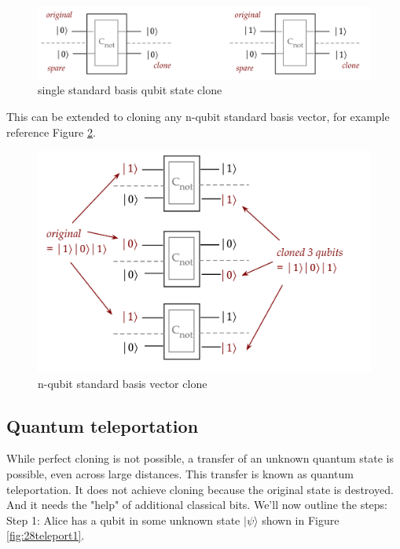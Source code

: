 \documentclass[main.tex]{subfiles}
\begin{document}
    \begin{figure}
        \centering
        \includegraphics[width=5in]{notes/figs/n07/26clone2.png}
        \caption{single standard basis qubit state clone}
        \label{fig:26clone2}
    \end{figure}
    
    This can be extended to cloning any n-qubit standard basis vector, for example reference Figure \ref{fig:27clone3}.
    
    \begin{figure}
        \centering
        \includegraphics[width=5in]{notes/figs/n07/27clone3.png}
        \caption{n-qubit standard basis vector clone}
        \label{fig:27clone3}
    \end{figure}

\subsection{Quantum teleportation}

    While perfect cloning is not possible, a transfer of an unknown quantum state is possible, even across large distances. This transfer is known as quantum teleportation. It does not achieve cloning because the original state is destroyed. And it needs the "help" of additional classical bits. We'll now outline the steps: Step 1: Alice has a qubit in some unknown state $|\psi\rangle$ shown in Figure \ref{fig:28teleport1}.
    
\end{document}
